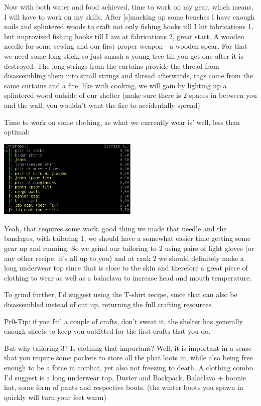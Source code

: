 \documentclass[11pt]{report}
\begin{document}
Now with both water and food achieved, time to work on my gear, which means, I will have to work on my skills. After [s]macking up some benches I have enough nails and splintered woods to craft not only fishing hooks till I hit fabrications 1, but improvised fishing hooks till I am at fabrications 2, great start. A wooden needle for some sewing and our first proper weapon - a wooden spear. For that we need some long stick, so just smash a young tree till you get one after it is destroyed. The long strings from the curtains provide the thread from disassembling them into small strings and thread afterwards, rags come from the same curtains and a fire, like with cooking, we will gain by lighting up a splintered wood outside of our shelter (make sure there is 2 spaces in between you and the wall, you wouldn't want the fire to accidentally spread)

Time to work on some clothing, as what we currently wear is' well, less than optimal:

\begin{center}
\includegraphics[width=0.5\textwidth]{11}
\end{center}

Yeah, that requires some work. good thing we made that needle and the bandages, with tailoring 1, we should have a somewhat easier time getting some gear up and running. So we grind our tailoring to 2 using pairs of light gloves (or any other recipe, it's all up to you) and at rank 2 we should definitely  make a long underwear top since that is close to the skin and therefore a great piece of clothing to wear as well as a balaclava to increase head and mouth temperature.

To grind further, I'd suggest using the T-shirt recipe, since that can also be disassembled instead of cut up, returning the full crafting resources.

Pr0-Tip: if you fail a couple of crafts, don't sweat it, the shelter has generally enough sheets to keep you outfitted for the first crafts that you do.

But why tailoring 3? Is clothing that important? Well, it is important in a sense that you require some pockets to store all the phat loots in, while also being free enough to be a force in combat, yet also not freezing to death. A clothing combo I'd suggest is a long underwear top, Duster and Backpack, Balaclava + boonie hat, some form of pants and respective boots. (the winter boots you spawn in quickly will turn your feet warm)
\end{document}
